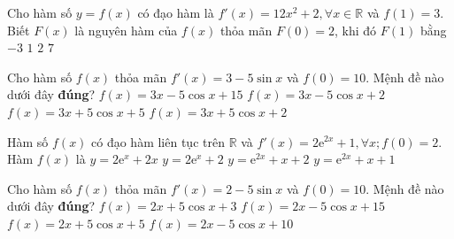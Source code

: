 \begin{ex}%
	Cho hàm số $y=f(x)$ có đạo hàm là $f'(x)=12x^2+2, \forall x\in \mathbb{R}$ và $f(1)=3$. Biết $F(x)$ là nguyên hàm của $f(x)$ thỏa mãn $F(0)=2$, khi đó $F(1)$ bằng
	\choice
	{$-3$}
	{\True $1$}
	{$2$}
	{$7$}
\end{ex}
\begin{ex}%
	Cho hàm số $f(x)$ thỏa mãn $f'(x)=3-5\sin x$ và $f(0)=10$. Mệnh đề nào dưới đây \textbf{đúng}?
	\choice
	{$f(x)=3x-5\cos x+15$}
	{$f(x)=3x-5\cos x+2$}
	{\True $f(x)=3x+5\cos x+5$}
	{$f(x)=3x+5\cos x+2$}
\end{ex}
\begin{ex}%
	Hàm số $f(x)$ có đạo hàm liên tục trên $\mathbb{R}$ và $f'(x)=2\mathrm{e}^{2x}+1, \forall x; f(0)=2$. Hàm $f(x)$ là
	\choice
	{$y=2\mathrm{e}^x+2x$}
	{$y=2\mathrm{e}^x+2$}
	{$y=\mathrm{e}^{2x}+x+2$}
	{\True $y=\mathrm{e}^{2x}+x+1$}
\end{ex}
\begin{ex}%
	Cho hàm số $f(x)$ thỏa mãn $f'(x)=2-5\sin x$ và $ f(0)=10$. Mệnh đề nào dưới đây \textbf{đúng}?
	\choice
	{$f(x)=2x+5\cos x+3$}
	{$f(x)=2x-5\cos x+15$}
	{\True $f(x)=2x+5\cos x+5$}
	{$f(x)=2x-5\cos x+10$}
\end{ex}

